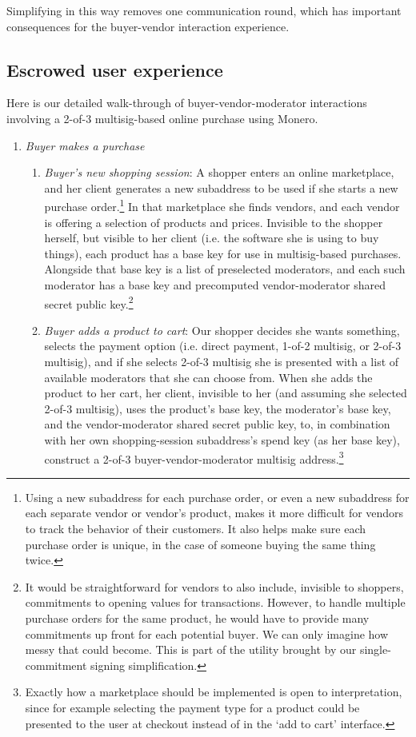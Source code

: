 Simplifying in this way removes one communication round, which has important consequences for the buyer-vendor interaction experience.


\subsection{Escrowed user experience}
\label{subsec:escrowed-marketplace-escrow-user-experience}

Here is our detailed walk-through of buyer-vendor-moderator interactions involving a 2-of-3 multisig-based online purchase using Monero.
\begin{enumerate}
    \item {\em Buyer makes a purchase}
    \begin{enumerate}
        \item {\em Buyer's new shopping session}: A shopper enters an online marketplace, and her client generates a new subaddress to be used if she starts a new purchase order.\footnote{Using a new subaddress for each purchase order, or even a new subaddress for each separate vendor or vendor's product, makes it more difficult for vendors to track the behavior of their customers. It also helps make sure each purchase order is unique, in the case of someone buying the same thing twice.} In that marketplace she finds vendors, and each vendor is offering a selection of products and prices. Invisible to the shopper herself, but visible to her client (i.e. the software she is using to buy things), each product has a base key for use in multisig-based purchases. Alongside that base key is a list of preselected moderators, and each such moderator has a base key and precomputed vendor-moderator shared secret public key.\footnote{It would be straightforward for vendors to also include, invisible to shoppers, commitments to opening values for transactions. However, to handle multiple purchase orders for the same product, he would have to provide many commitments up front for each potential buyer. We can only imagine how messy that could become. This is part of the utility brought by our single-commitment signing simplification.}
        \item {\em Buyer adds a product to cart}: Our shopper decides she wants something, selects the payment option (i.e. direct payment, 1-of-2 multisig, or 2-of-3 multisig), and if she selects 2-of-3 multisig she is presented with a list of available moderators that she can choose from. When she adds the product to her cart, her client, invisible to her (and assuming she selected 2-of-3 multisig), uses the product's base key, the moderator's base key, and the vendor-moderator shared secret public key, to, in combination with her own shopping-session subaddress's spend key (as her base key), construct a 2-of-3 buyer-vendor-moderator multisig address.\footnote{Exactly how a marketplace should be implemented is open to interpretation, since for example selecting the payment type for a product could be presented to the user at checkout instead of in the `add to cart' interface.}\\


\end{enumerate}
\end{enumerate}
